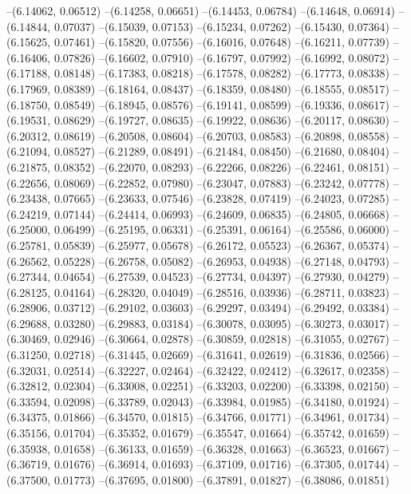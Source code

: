 --(6.14062, 0.06512)
--(6.14258, 0.06651)
--(6.14453, 0.06784)
--(6.14648, 0.06914)
--(6.14844, 0.07037)
--(6.15039, 0.07153)
--(6.15234, 0.07262)
--(6.15430, 0.07364)
--(6.15625, 0.07461)
--(6.15820, 0.07556)
--(6.16016, 0.07648)
--(6.16211, 0.07739)
--(6.16406, 0.07826)
--(6.16602, 0.07910)
--(6.16797, 0.07992)
--(6.16992, 0.08072)
--(6.17188, 0.08148)
--(6.17383, 0.08218)
--(6.17578, 0.08282)
--(6.17773, 0.08338)
--(6.17969, 0.08389)
--(6.18164, 0.08437)
--(6.18359, 0.08480)
--(6.18555, 0.08517)
--(6.18750, 0.08549)
--(6.18945, 0.08576)
--(6.19141, 0.08599)
--(6.19336, 0.08617)
--(6.19531, 0.08629)
--(6.19727, 0.08635)
--(6.19922, 0.08636)
--(6.20117, 0.08630)
--(6.20312, 0.08619)
--(6.20508, 0.08604)
--(6.20703, 0.08583)
--(6.20898, 0.08558)
--(6.21094, 0.08527)
--(6.21289, 0.08491)
--(6.21484, 0.08450)
--(6.21680, 0.08404)
--(6.21875, 0.08352)
--(6.22070, 0.08293)
--(6.22266, 0.08226)
--(6.22461, 0.08151)
--(6.22656, 0.08069)
--(6.22852, 0.07980)
--(6.23047, 0.07883)
--(6.23242, 0.07778)
--(6.23438, 0.07665)
--(6.23633, 0.07546)
--(6.23828, 0.07419)
--(6.24023, 0.07285)
--(6.24219, 0.07144)
--(6.24414, 0.06993)
--(6.24609, 0.06835)
--(6.24805, 0.06668)
--(6.25000, 0.06499)
--(6.25195, 0.06331)
--(6.25391, 0.06164)
--(6.25586, 0.06000)
--(6.25781, 0.05839)
--(6.25977, 0.05678)
--(6.26172, 0.05523)
--(6.26367, 0.05374)
--(6.26562, 0.05228)
--(6.26758, 0.05082)
--(6.26953, 0.04938)
--(6.27148, 0.04793)
--(6.27344, 0.04654)
--(6.27539, 0.04523)
--(6.27734, 0.04397)
--(6.27930, 0.04279)
--(6.28125, 0.04164)
--(6.28320, 0.04049)
--(6.28516, 0.03936)
--(6.28711, 0.03823)
--(6.28906, 0.03712)
--(6.29102, 0.03603)
--(6.29297, 0.03494)
--(6.29492, 0.03384)
--(6.29688, 0.03280)
--(6.29883, 0.03184)
--(6.30078, 0.03095)
--(6.30273, 0.03017)
--(6.30469, 0.02946)
--(6.30664, 0.02878)
--(6.30859, 0.02818)
--(6.31055, 0.02767)
--(6.31250, 0.02718)
--(6.31445, 0.02669)
--(6.31641, 0.02619)
--(6.31836, 0.02566)
--(6.32031, 0.02514)
--(6.32227, 0.02464)
--(6.32422, 0.02412)
--(6.32617, 0.02358)
--(6.32812, 0.02304)
--(6.33008, 0.02251)
--(6.33203, 0.02200)
--(6.33398, 0.02150)
--(6.33594, 0.02098)
--(6.33789, 0.02043)
--(6.33984, 0.01985)
--(6.34180, 0.01924)
--(6.34375, 0.01866)
--(6.34570, 0.01815)
--(6.34766, 0.01771)
--(6.34961, 0.01734)
--(6.35156, 0.01704)
--(6.35352, 0.01679)
--(6.35547, 0.01664)
--(6.35742, 0.01659)
--(6.35938, 0.01658)
--(6.36133, 0.01659)
--(6.36328, 0.01663)
--(6.36523, 0.01667)
--(6.36719, 0.01676)
--(6.36914, 0.01693)
--(6.37109, 0.01716)
--(6.37305, 0.01744)
--(6.37500, 0.01773)
--(6.37695, 0.01800)
--(6.37891, 0.01827)
--(6.38086, 0.01851)
